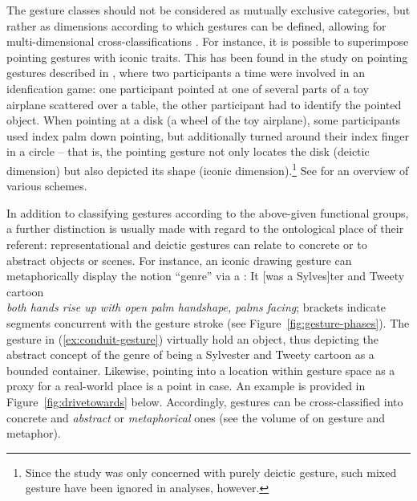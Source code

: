 \documentclass[output=paper]{langsci/langscibook}
\begin{document}
The gesture classes should not be considered as mutually exclusive categories, but rather as dimensions according to which gestures can be defined, allowing for multi-dimensional cross-classifications \citep{McNeill:2005,Gerwing:Bavelas:2004}.
%
For instance, it is possible to superimpose pointing gestures with iconic traits.
%
This has been found in the study on pointing gestures described in \citet{Kranstedt:Luecking:Pfeiffer:Rieser:Wachsmuth:2006:b}, where two participants a time were involved in an idenfication game: one participant pointed at one of several parts of a toy airplane scattered over a table, the other participant had to identify the pointed object.
%
When pointing at a disk (a wheel of the toy airplane), some participants used index palm down pointing, but additionally turned around their index finger in a circle -- that is, the pointing gesture not only locates the disk (deictic dimension) but also depicted its shape (iconic dimension).\footnote{Since the study was only concerned with purely deictic gesture, such mixed gesture have been ignored in analyses, however.}
%
See \citet{Ozyurek:2012} for an overview of various  schemes.



In addition to classifying gestures according to the above-given functional groups, a further distinction is usually made with regard to the ontological place of their referent: representational and deictic gestures can relate to concrete or to abstract objects or scenes. 
%
For instance, an iconic drawing gesture can metaphorically display the notion \enquote{genre} via a  \citep[]{McNeill:1992}:
%
\ea \label{ex:conduit-gesture}
It [was a Sylves]ter and Tweety cartoon \\
\textit{both hands rise up with open palm handshape, palms facing}; brackets indicate segments concurrent with the gesture stroke (see Figure~\ref{fig:gesture-phases}). 
\z 
%
The gesture in (\ref{ex:conduit-gesture}) virtually hold an object, thus depicting the abstract concept of the genre of being a Sylvester and Tweety cartoon as a bounded container.
%
Likewise, pointing into a location within gesture space as a proxy for a real-world place is a point in case.
%
An example is provided in Figure~\ref{fig:drivetowards} below.
%
Accordingly, gestures can be cross-classified into concrete and \emph{abstract} or \emph{metaphorical}   ones (see the volume of \citet{Cienki:Mueller:2008} on gesture and metaphor).
\end{document}

